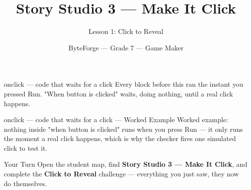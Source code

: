 \documentclass[aspectratio=169]{beamer}
\title{Story Studio 3 — Make It Click}
\subtitle{Lesson 1: Click to Reveal}
\author{ByteForge --- Grade 7 --- Game Maker}
\date{}
\begin{document}
\begin{frame}
    \titlepage
\end{frame}

\begin{frame}{onclick — code that waits for a click}
    \Large
    Every block before this ran the instant you pressed Run. "When button is clicked" waits, doing nothing, until a real click happens.

    \begin{center}
    \end{center}
\end{frame}

\begin{frame}{onclick — code that waits for a click --- Worked Example}
    \Large
    Worked example: nothing inside "when button is clicked" runs when you press Run — it only runs the moment a real click happens, which is why the checker fires one simulated click to test it.
\end{frame}

\begin{frame}{Your Turn}
    \Large
    Open the student map, find \textbf{Story Studio 3 — Make It Click}, and complete
    the \textbf{Click to Reveal} challenge --- everything you just saw, they now do themselves.
\end{frame}
\end{document}

